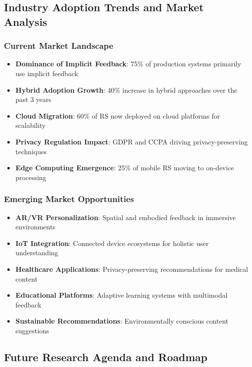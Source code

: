 \documentclass[acmsmall,review,anonymous]{acmart}
\begin{document}
\subsection{Industry Adoption Trends and Market Analysis}

\subsubsection{Current Market Landscape}

\begin{itemize}
    \item \textbf{Dominance of Implicit Feedback}: 75\% of production systems primarily use implicit feedback
    \item \textbf{Hybrid Adoption Growth}: 40\% increase in hybrid approaches over the past 3 years
    \item \textbf{Cloud Migration}: 60\% of RS now deployed on cloud platforms for scalability
    \item \textbf{Privacy Regulation Impact}: GDPR and CCPA driving privacy-preserving techniques
    \item \textbf{Edge Computing Emergence}: 25\% of mobile RS moving to on-device processing
\end{itemize}

\subsubsection{Emerging Market Opportunities}

\begin{itemize}
    \item \textbf{AR/VR Personalization}: Spatial and embodied feedback in immersive environments
    \item \textbf{IoT Integration}: Connected device ecosystems for holistic user understanding
    \item \textbf{Healthcare Applications}: Privacy-preserving recommendations for medical content
    \item \textbf{Educational Platforms}: Adaptive learning systems with multimodal feedback
    \item \textbf{Sustainable Recommendations}: Environmentally conscious content suggestions
\end{itemize}

\subsection{Future Research Agenda and Roadmap}
\end{document}
